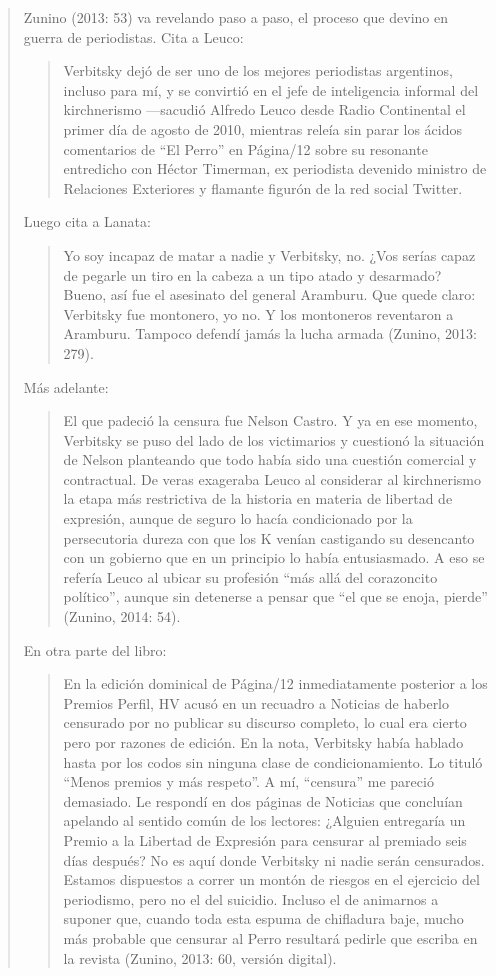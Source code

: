 \begin{quote}
Zunino (2013: 53) va revelando paso a paso, el proceso que devino en guerra de periodistas. Cita a Leuco:

\begin{quote}
	Verbitsky dejó de ser uno de los mejores periodistas argentinos, incluso para mí, y se convirtió en el jefe de inteligencia informal del kirchnerismo ---sacudió Alfredo Leuco desde Radio Continental el primer día de agosto de 2010, mientras releía sin parar los ácidos comentarios de ``El Perro'' en Página/12 sobre su resonante entredicho con Héctor Timerman, ex periodista devenido ministro de Relaciones Exteriores y flamante figurón de la red social Twitter.
\end{quote}


Luego cita a Lanata:

\begin{quote}
	Yo soy incapaz de matar a nadie y Verbitsky, no. ¿Vos serías capaz de pegarle un tiro en la cabeza a un tipo atado y desarmado? Bueno, así fue el asesinato del general Aramburu. Que quede claro: Verbitsky fue montonero, yo no. Y los montoneros reventaron a Aramburu. Tampoco defendí jamás la lucha armada (Zunino, 2013: 279).
\end{quote}


Más adelante:

\begin{quote}
	El que padeció la censura fue Nelson Castro. Y ya en ese momento, Verbitsky se puso del lado de los victimarios y cuestionó la situación de Nelson planteando que todo había sido una cuestión comercial y contractual. De veras exageraba Leuco al considerar al kirchnerismo la etapa más restrictiva de la historia en materia de libertad de expresión, aunque de seguro lo hacía condicionado por la persecutoria dureza con que los K venían castigando su desencanto con un gobierno que en un principio lo había entusiasmado. A eso se refería Leuco al ubicar su profesión ``más allá del corazoncito político'', aunque sin detenerse a pensar que ``el que se enoja, pierde'' (Zunino, 2014: 54).
\end{quote}


En otra parte del libro:

\begin{quote}
	En la edición dominical de Página/12 inmediatamente posterior a los Premios Perfil, HV acusó en un recuadro a Noticias de haberlo censurado por no publicar su discurso completo, lo cual era cierto pero por razones de edición. En la nota, Verbitsky había hablado hasta por los codos sin ninguna clase de condicionamiento. Lo tituló ``Menos premios y más respeto''. A mí, ``censura'' me pareció demasiado. Le respondí en dos páginas de Noticias que concluían apelando al sentido común de los lectores: ¿Alguien entregaría un Premio a la Libertad de Expresión para censurar al premiado seis días después? No es aquí donde Verbitsky ni nadie serán censurados. Estamos dispuestos a correr un montón de riesgos en el ejercicio del periodismo, pero no el del suicidio. Incluso el de animarnos a suponer que, cuando toda esta espuma de chifladura baje, mucho más probable que censurar al Perro resultará pedirle que escriba en la revista (Zunino, 2013: 60, versión digital).
\end{quote}



\end{quote}

